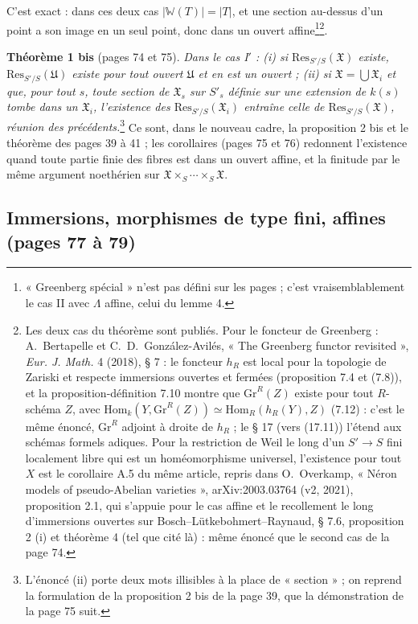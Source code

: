 \documentclass[11pt,a4paper]{article}
\begin{document}
C'est exact : dans ces deux cas $|\mathbb{W}(T)| = |T|$, et une section au-dessus
d'un point a son image en un seul point, donc dans un ouvert
affine\footnote{« Greenberg spécial » n'est pas défini sur les pages ; c'est
vraisemblablement le cas II avec $\Lambda$ affine, celui du lemme 4.}\footnote{Les
deux cas du théorème sont publiés. Pour le foncteur de Greenberg :
A.~Bertapelle et C.~D.~González-Avilés, « The Greenberg functor revisited »,
\emph{Eur. J. Math.} 4 (2018), § 7 : le foncteur $h_R$ est local pour la
topologie de Zariski et respecte immersions ouvertes et fermées (proposition
7.4 et (7.8)), et la proposition-définition 7.10 montre que $\mathrm{Gr}^R(Z)$
existe pour tout $R$-schéma $Z$, avec $\mathrm{Hom}_k(Y, \mathrm{Gr}^R(Z)) \simeq
\mathrm{Hom}_R(h_R(Y), Z)$ (7.12) : c'est le même énoncé, $\mathrm{Gr}^R$ adjoint à
droite de $h_R$ ; le § 17 (vers (17.11)) l'étend aux schémas formels adiques.
Pour la restriction de Weil le long d'un $S' \to S$ fini localement libre qui
est un homéomorphisme universel, l'existence pour tout $X$ est le corollaire
A.5 du même article, repris dans O.~Overkamp, « Néron models of
pseudo-Abelian varieties », arXiv:2003.03764 (v2, 2021), proposition 2.1, qui
s'appuie pour le cas affine et le recollement le long d'immersions ouvertes
sur Bosch--Lütkebohmert--Raynaud, § 7.6, proposition 2 (i) et théorème 4 (tel
que cité là) : même énoncé que le second cas de la page 74.}.

\textbf{Théorème 1 bis} (pages 74 et 75). \emph{Dans le cas I$'$ : (i) si
$\mathrm{Res}_{S'/S}(\mathfrak{X})$ existe, $\mathrm{Res}_{S'/S}(\mathfrak{U})$ existe
pour tout ouvert $\mathfrak{U}$ et en est un ouvert ; (ii) si $\mathfrak{X} =
\bigcup \mathfrak{X}_i$ et que, pour tout $s$, toute section de $\mathfrak{X}_s$
sur $S'_s$ définie sur une extension de $k(s)$ tombe dans un $\mathfrak{X}_i$,
l'existence des $\mathrm{Res}_{S'/S}(\mathfrak{X}_i)$ entraîne celle de
$\mathrm{Res}_{S'/S}(\mathfrak{X})$, réunion des
précédents.}\footnote{L'énoncé (ii) porte deux mots illisibles à la place de
« section » ; on reprend la formulation de la proposition 2 bis de la page
39, que la démonstration de la page 75 suit.} Ce sont, dans le nouveau
cadre, la proposition 2 bis et le théorème des pages 39 à 41 ; les
corollaires (pages 75 et 76) redonnent l'existence quand toute partie finie
des fibres est dans un ouvert affine, et la finitude par le même argument
noethérien sur $\mathfrak{X} \times_S \cdots \times_S \mathfrak{X}$.

\subsection*{Immersions, morphismes de type fini, affines (pages 77 à 79)}
\end{document}
